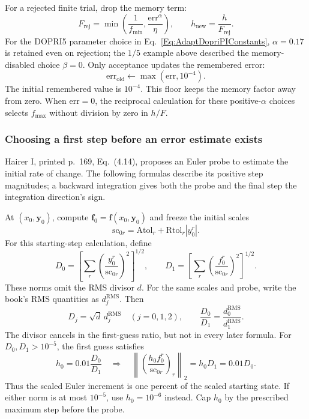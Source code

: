 For a rejected finite trial, drop the memory term:
\begin{equation}\label{Eq:AdaptPIRejected}
 F_{\mathrm{rej}}=\min\!\left(\frac1{f_{\min}},
                         \frac{\mathrm{err}^{\alpha}}{\eta}\right),
 \qquad h_{\mathrm{new}}=\frac h{F_{\mathrm{rej}}}.
\end{equation}
For the DOPRI5 parameter choice in Eq.~\ref{Eq:AdaptDopriPIConstants},
$\alpha=0.17$ is retained even on rejection; the
$1/5$ example above described the memory-disabled choice $\beta=0$.
Only acceptance updates the remembered error:
\[
 \mathrm{err}_{\mathrm{old}}\leftarrow\max(\mathrm{err},10^{-4}).
\]
The initial remembered value is $10^{-4}$. This floor keeps the memory factor
away from zero. When $\mathrm{err}=0$, the reciprocal calculation for these
positive-$\alpha$ choices selects $f_{\max}$ without division by zero in
$h/F$.

\subsubsection{Choosing a first step before an error estimate exists}
Hairer I, printed p.~169, Eq.~(4.14), proposes an Euler probe to estimate the
initial rate of change. The following
formulas describe its positive step magnitudes; a backward integration gives
both the probe and the final step the integration direction's sign.

At $(x_0,\mathbf y_0)$, compute $\mathbf f_0=\mathbf f(x_0,\mathbf y_0)$ and
freeze the initial scales
\[
 \mathrm{sc}_{0r}=\mathrm{Atol}_r+\mathrm{Rtol}_r|y_0^r|.
\]
For this starting-step calculation, define
\begin{equation}\label{Eq:AdaptInitialNorms}
 D_0=\left[\sum_r\left(\frac{y_0^r}{\mathrm{sc}_{0r}}\right)^2\right]^{1/2},
 \qquad
 D_1=\left[\sum_r\left(\frac{f_0^r}{\mathrm{sc}_{0r}}\right)^2\right]^{1/2}.
\end{equation}
These norms omit the RMS divisor $d$. For the same scales and probe,
write the book's RMS quantities as $d_j^{\mathrm{RMS}}$. Then
\[
 D_j=\sqrt d\,d_j^{\mathrm{RMS}}\quad(j=0,1,2),\qquad
 \frac{D_0}{D_1}=\frac{d_0^{\mathrm{RMS}}}{d_1^{\mathrm{RMS}}}.
\]
The divisor cancels in the first-guess ratio, but not in every later formula.
For $D_0,D_1>10^{-5}$, the first guess satisfies
\[
 h_0=0.01\frac{D_0}{D_1}
 \quad\Longrightarrow\quad
 \left\|\left(\frac{h_0f_0^r}{\mathrm{sc}_{0r}}\right)_r\right\|_2
 =h_0D_1=0.01D_0.
\]
Thus the scaled Euler increment is one percent of the scaled starting state.
If either norm is at most $10^{-5}$, use $h_0=10^{-6}$ instead. Cap $h_0$
by the prescribed maximum step before the probe.

